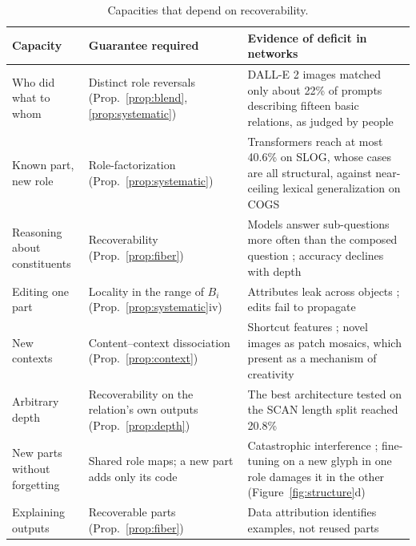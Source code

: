 \documentclass[10pt]{article}
\theoremstyle{plain}
\theoremstyle{remark}
\begin{document}
\begin{table}[h]
  \caption{Capacities that depend on recoverability.}
  \label{tab:cases}
  \centering\small
  \begin{tabularx}{\linewidth}{@{}P{3.4cm}P{4.4cm}Y@{}}
    \toprule
    Capacity & Guarantee required & Evidence of deficit in networks \\
    \midrule
    Who did what to whom & Distinct role reversals (Prop.~\ref{prop:blend}, \ref{prop:systematic}) & DALL-E 2 images matched only about 22\% of prompts describing fifteen basic relations, as judged by people \citep{conwell2022} \\
    Known part, new role & Role-factorization (Prop.~\ref{prop:systematic}) & Transformers reach at most 40.6\% on SLOG, whose cases are all structural, against near-ceiling lexical generalization on COGS \citep{li2023slog} \\
    Reasoning about constituents & Recoverability (Prop.~\ref{prop:fiber}) & Models answer sub-questions more often than the composed question \citep{press2023}; accuracy declines with depth \citep{dziri2023} \\
    Editing one part & Locality in the range of $B_i$ (Prop.~\ref{prop:systematic}iv) & Attributes leak across objects \citep{rassin2022,huang2023t2i}; edits fail to propagate \citep{cohen2024} \\
    New contexts & Content--context dissociation (Prop.~\ref{prop:context}) & Shortcut features \citep{geirhos2020}; novel images as patch mosaics, which \citet{kamb2025} present as a mechanism of creativity \\
    Arbitrary depth & Recoverability on the relation's own outputs (Prop.~\ref{prop:depth}) & The best architecture tested on the SCAN length split reached 20.8\% \citep{lake2018} \\
    New parts without forgetting & Shared role maps; a new part adds only its code & Catastrophic interference \citep{mccloskey1989,french1999}; fine-tuning on a new glyph in one role damages it in the other (Figure~\ref{fig:structure}d) \\
    Explaining outputs & Recoverable parts (Prop.~\ref{prop:fiber}) & Data attribution identifies examples, not reused parts \citep{koh2017,grosse2023} \\
    \bottomrule
  \end{tabularx}
\end{table}
\end{document}
